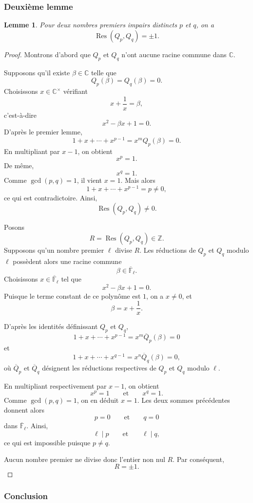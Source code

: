 \documentclass[11pt,a4paper]{article}
\newtheorem{lemma}{Lemme}
\newcommand{\Res}{\operatorname{Res}}
\begin{document}
\subsubsection{Deuxième lemme}

\begin{lemma}
Pour deux nombres premiers impairs distincts \(p\) et \(q\), on a
\[
\Res(Q_p,Q_q)=\pm1.
\]
\end{lemma}

\begin{proof}
Montrons d'abord que \(Q_p\) et \(Q_q\) n'ont aucune racine commune dans
\(\mathbb{C}\).

Supposons qu'il existe \(\beta\in\mathbb{C}\) telle que
\[
Q_p(\beta)=Q_q(\beta)=0.
\]
Choisissons \(x\in\mathbb{C}^{\times}\) vérifiant
\[
x+\frac{1}{x}=\beta,
\]
c'est-à-dire
\[
x^2-\beta x+1=0.
\]
D'après le premier lemme,
\[
1+x+\cdots+x^{p-1}
=
x^mQ_p(\beta)
=
0.
\]
En multipliant par \(x-1\), on obtient
\[
x^p=1.
\]
De même,
\[
x^q=1.
\]
Comme \(\gcd(p,q)=1\), il vient \(x=1\). Mais alors
\[
1+x+\cdots+x^{p-1}=p\neq0,
\]
ce qui est contradictoire. Ainsi,
\[
\Res(Q_p,Q_q)\neq0.
\]

Posons
\[
R=\Res(Q_p,Q_q)\in\mathbb{Z}.
\]
Supposons qu'un nombre premier \(\ell\) divise \(R\). Les réductions de
\(Q_p\) et \(Q_q\) modulo \(\ell\) possèdent alors une racine commune
\[
\beta\in\overline{\mathbb{F}}_{\ell}.
\]
Choisissons \(x\in\overline{\mathbb{F}}_{\ell}\) tel que
\[
x^2-\beta x+1=0.
\]
Puisque le terme constant de ce polynôme est \(1\), on a \(x\neq0\), et
\[
\beta=x+\frac{1}{x}.
\]

D'après les identités définissant \(Q_p\) et \(Q_q\),
\[
1+x+\cdots+x^{p-1}
=
x^m\overline{Q}_p(\beta)
=
0
\]
et
\[
1+x+\cdots+x^{q-1}
=
x^n\overline{Q}_q(\beta)
=
0,
\]
où \(\overline{Q}_p\) et \(\overline{Q}_q\) désignent les réductions
respectives de \(Q_p\) et \(Q_q\) modulo \(\ell\).

En multipliant respectivement par \(x-1\), on obtient
\[
x^p=1
\qquad\text{et}\qquad
x^q=1.
\]
Comme \(\gcd(p,q)=1\), on en déduit \(x=1\). Les deux sommes précédentes
donnent alors
\[
p=0
\qquad\text{et}\qquad
q=0
\]
dans \(\overline{\mathbb{F}}_{\ell}\). Ainsi,
\[
\ell\mid p
\qquad\text{et}\qquad
\ell\mid q,
\]
ce qui est impossible puisque \(p\neq q\).

Aucun nombre premier ne divise donc l'entier non nul \(R\). Par conséquent,
\[
R=\pm1.
\]
\end{proof}

\subsubsection{Conclusion}
\end{document}
